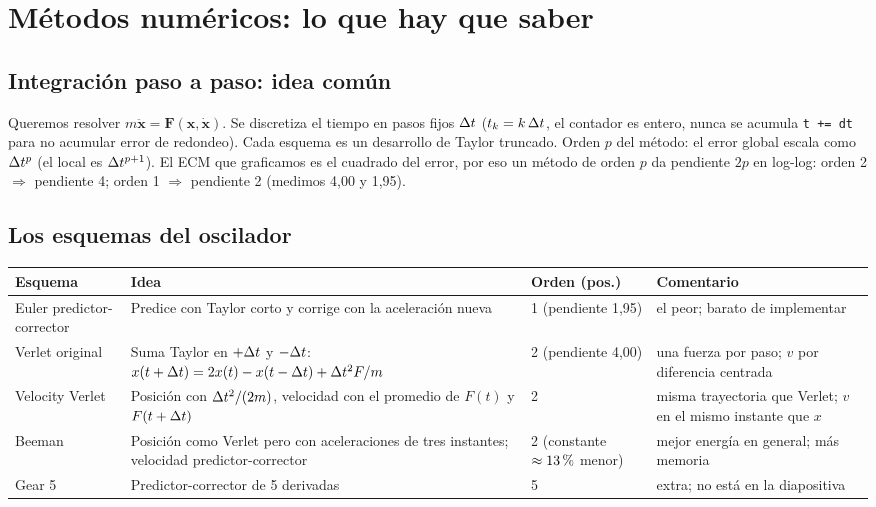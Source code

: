 \documentclass[10.5pt,a4paper]{article}
\begin{document}
\section{Métodos numéricos: lo que hay que saber}

\subsection{Integración paso a paso: idea común}
Queremos resolver $m\ddot{\mathbf x}=\mathbf F(\mathbf x,\dot{\mathbf x})$. Se discretiza el tiempo en pasos fijos $\Delta t$ ($t_k=k\,\Delta t$, el contador es entero, nunca se acumula \texttt{t += dt} para no acumular error de redondeo). Cada esquema es un desarrollo de Taylor truncado. Orden $p$ del método: el error global escala como $\Delta t^{p}$ (el local es $\Delta t^{p+1}$). El ECM que graficamos es el cuadrado del error, por eso un método de orden $p$ da pendiente $2p$ en log-log: orden 2 $\Rightarrow$ pendiente 4; orden 1 $\Rightarrow$ pendiente 2 (medimos 4,00 y 1,95).

\subsection{Los esquemas del oscilador}
\begin{center}\small
\begin{tabular}{@{}p{2.6cm}p{5.6cm}p{2.9cm}p{4.6cm}@{}}
\toprule
Esquema & Idea & Orden (pos.) & Comentario \\ \midrule
Euler predictor-corrector & Predice con Taylor corto y corrige con la aceleración nueva & 1 (pendiente 1,95) & el peor; barato de implementar \\
Verlet original & Suma Taylor en $+\Delta t$ y $-\Delta t$: $x(t+\Delta t)=2x(t)-x(t-\Delta t)+\Delta t^2F/m$ & 2 (pendiente 4,00) & una fuerza por paso; $v$ por diferencia centrada \\
Velocity Verlet & Posición con $\Delta t^2/(2m)$, velocidad con el promedio de $F(t)$ y $F(t+\Delta t)$ & 2 & misma trayectoria que Verlet; $v$ en el mismo instante que $x$ \\
Beeman & Posición como Verlet pero con aceleraciones de tres instantes; velocidad predictor-corrector & 2 (constante $\approx13\,\pc$ menor) & mejor energía en general; más memoria \\
Gear 5 & Predictor-corrector de 5 derivadas & 5 & extra; no está en la diapositiva \\ \bottomrule
\end{tabular}
\end{center}
\end{document}
